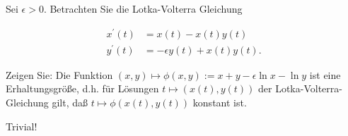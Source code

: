 \begin{exercise}

Sei $\epsilon > 0$. Betrachten Sie die  Lotka-Volterra Gleichung

\begin{align*}
  x^\prime(t) & = x(t) - x(t)y(t) \\
  y^\prime(t) & = -\epsilon y(t) + x(t)y(t).
\end{align*}

Zeigen Sie: Die Funktion $(x, y) \mapsto \phi(x, y) := x + y - \epsilon \ln{x} - \ln{y}$ ist eine Erhaltungsgröße, d.h. für Lösungen $t \mapsto (x(t), y(t))$ der Lotka-Volterra-Gleichung gilt, daß $t \mapsto \phi(x(t), y(t))$ konstant ist.

\end{exercise}

\begin{solution}

Trivial!

\end{solution}

